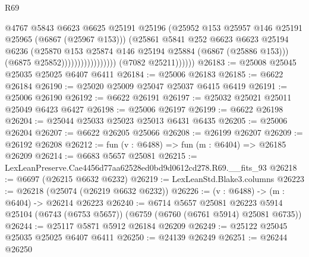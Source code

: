 \begin{lexlean}{R69}
\begin{coremodule}
{                                            @4767
                                            @5843
                                            @6623
                                            @6625
                                            @25191
                                            @25196
                                            (@25952
                                              @153
                                              @25957
                                              @146
                                              @25191
                                              @25965
                                              (@6867 (@25967 @153)))
                                            (@25861
                                              @5841
                                              @252
                                              @6623
                                              @6623
                                              @25194
                                              @6236
                                              (@25870
                                                @153
                                                @25874
                                                @146
                                                @25194
                                                @25884
                                                (@6867 (@25886 @153)))
                                              (@6875 @25852)))))))))))))))))
              (@7082 @25211))))))
@26183 := @25008 @25045 @25035 @25025 @6407 @6411
@26184 := @25006 @26183
@26185 := @6622 @26184
@26190 := @25020 @25009 @25047 @25037 @6415 @6419
@26191 := @25006 @26190
@26192 := @6622 @26191
@26197 := @25032 @25021 @25011 @25049 @6423 @6427
@26198 := @25006 @26197
@26199 := @6622 @26198
@26204 := @25044 @25033 @25023 @25013 @6431 @6435
@26205 := @25006 @26204
@26207 := @6622 @26205 @25066
@26208 := @26199 @26207
@26209 := @26192 @26208
@26212 := fun (v : @6488) => fun (m : @6404) => @26185 @26209
@26214 := @6683 @5657 @25081
@26215 := LexLeanPreserve.Cae4456d77aa62528ed0bd9d0612cd278.R69.__fits_93
@26218 := @6697 (@26215 @6632 @6232)
@26219 := LexLeanStd.Blake3.columns
@26223 := @26218 (@25074 (@26219 @6632 @6232))
@26226 := (v : @6488) -> (m : @6404) -> @26214 @26223
@26240 := @6714
    @5657
    @25081
    @26223
    @5914
    @25104
    (@6743 (@6753 @5657))
    (@6759 (@6760 (@6761 @5914) @25081 @6735))
@26244 := @25117 @5871 @5912 @26184 @26209
@26249 := @25122 @25045 @25035 @25025 @6407 @6411
@26250 := @24139 @26249
@26251 := @26244 @26250
}
\end{coremodule}
\end{lexlean}
